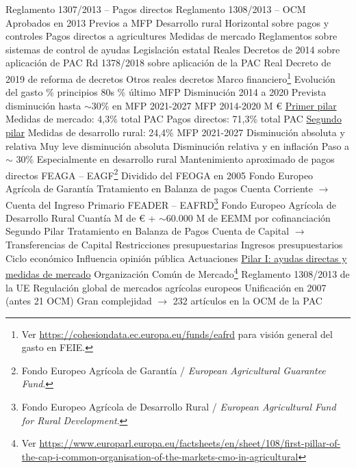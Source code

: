 \documentclass{nuevotema}
\begin{document}
\begin{esquemal}
				\4 Reglamento 1307/2013 -- Pagos directos
				\4 Reglamento 1308/2013 -- OCM
				\4 Aprobados en 2013
				\4[] Previos a MFP
				\4[I] Desarrollo rural
				\4[II] Horizontal sobre pagos y controles
				\4[III] Pagos directos a agricultures
				\4[IV] Medidas de mercado
				\4 Reglamentos sobre sistemas de control de ayudas
			\3 Legislación estatal
				\4 Reales Decretos de 2014 sobre aplicación de PAC
				\4 Rd 1378/2018 sobre aplicación de la PAC
				\4 Real Decreto de 2019 de reforma de decretos
				\4 Otros reales decretos
		\2 Marco financiero\footnote{Ver \url{https://cohesiondata.ec.europa.eu/funds/eafrd} para visión general del gasto en FEIE.}
			\3 Evolución del gasto
				\% principios 80s
				\% último MFP
				\4 Disminución 2014 a 2020
				\4 Prevista disminución hasta $\sim 30\%$ en MFP 2021-2027
			\3 MFP 2014-2020
				 M €
				\4 \underline{Primer pilar}
				\4[] Medidas de mercado: 4,3\% total PAC
				\4[] Pagos directos: 71,3\% total PAC
				\4 \underline{Segundo pilar}
				\4[] Medidas de desarrollo rural: 24,4\%
			\3 MFP 2021-2027
				\4 Disminución absoluta y relativa
				\4[] Muy leve disminución absoluta
				\4[] Disminución relativa y en inflación
				\4 Paso a $\sim$ 30\%
				\4[] Especialmente en desarrollo rural
				\4[] Mantenimiento aproximado de pagos directos
			\3 FEAGA -- EAGF\footnote{Fondo Europeo Agrícola de Garantía / \textit{European Agricultural Guarantee Fund}.}
				\4 Dividido del FEOGA en 2005
				\4 Fondo Europeo Agrícola de Garantía
				\4 Tratamiento en Balanza de pagos
				\4[] Cuenta Corriente
				\4[] $\to$ Cuenta del Ingreso Primario
			\3 FEADER -- EAFRD\footnote{Fondo Europeo Agrícola de Desarrollo Rural / \textit{European Agricultural Fund for Rural Development}.}
				\4 Fondo Europeo Agrícola de Desarrollo Rural
				\4 Cuantía
				 M de €
				\4[] + $\sim 60.000$ M de EEMM por cofinanciación
				\4 Segundo Pilar
				\4 Tratamiento en Balanza de Pagos
				\4[] Cuenta de Capital
				\4[] $\to$ Transferencias de Capital
			\3 Restricciones presupuestarias
				\4 Ingresos presupuestarios
				\4 Ciclo económico
				\4 Influencia opinión pública
		\2 Actuaciones
			\3 \underline{Pilar I: ayudas directas y medidas de mercado}
			\3 {Organización Común de Mercado}\footnote{Ver \url{https://www.europarl.europa.eu/factsheets/en/sheet/108/first-pillar-of-the-cap-i-common-organisation-of-the-markets-cmo-in-agricultural}}
				\4 Reglamento 1308/2013 de la UE
				\4 Regulación global de mercados agrícolas europeos
				\4 Unificación en 2007 (antes 21 OCM)
				\4 Gran complejidad
				\4[] $\to$ 232 artículos en la OCM de la PAC

\end{esquemal}
\end{document}
